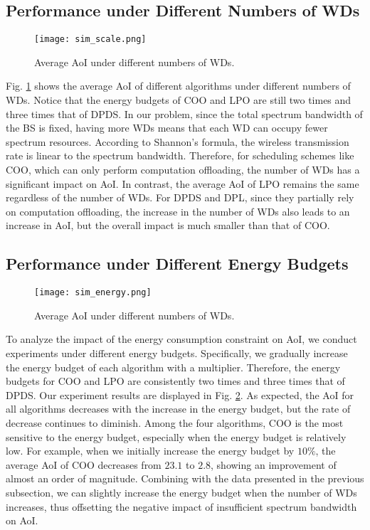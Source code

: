 \documentclass[lettersize, journal]{IEEEtran}
\begin{document}
\subsection{Performance under Different Numbers of WDs}
\begin{figure}[t]
  \centering
  \texttt{[image: sim\_scale.png]}
  \caption{Average AoI under different numbers of WDs.}
  \label{fig:scale}
\end{figure}
Fig. \ref{fig:scale} shows the average AoI of different algorithms under different numbers of WDs.
Notice that the energy budgets of COO and LPO are still two times and three times that of DPDS.
In our problem, since the total spectrum bandwidth of the BS is fixed, having more WDs means that each WD can occupy fewer spectrum resources.
According to Shannon's formula, the wireless transmission rate is linear to the spectrum bandwidth.
Therefore, for scheduling schemes like COO, which can only perform computation offloading, the number of WDs has a significant impact on AoI.
In contrast, the average AoI of LPO remains the same regardless of the number of WDs.
For DPDS and DPL, since they partially rely on computation offloading, 
the increase in the number of WDs also leads to an increase in AoI, but the overall impact is much smaller than that of COO.

\subsection{Performance under Different Energy Budgets}
\begin{figure}[t]
  \centering
  \texttt{[image: sim\_energy.png]}
  \caption{Average AoI under different numbers of WDs.}
  \label{fig:energy}
\end{figure}
To analyze the impact of the energy consumption constraint on AoI, we conduct experiments under different energy budgets.
Specifically, we gradually increase the energy budget of each algorithm with a multiplier.
Therefore, the energy budgets for COO and LPO are consistently two times and three times that of DPDS.
Our experiment results are displayed in Fig. \ref{fig:energy}.
As expected, the AoI for all algorithms decreases with the increase in the energy budget, 
but the rate of decrease continues to diminish.
Among the four algorithms, COO is the most sensitive to the energy budget, especially when the energy budget is relatively low. 
For example, when we initially increase the energy budget by $10\%$, the average AoI of COO decreases from $23.1$ to $2.8$, 
showing an improvement of almost an order of magnitude.
Combining with the data presented in the previous subsection, we can slightly increase the energy budget when the number of WDs increases,
thus offsetting the negative impact of insufficient spectrum bandwidth on AoI.
\end{document}
